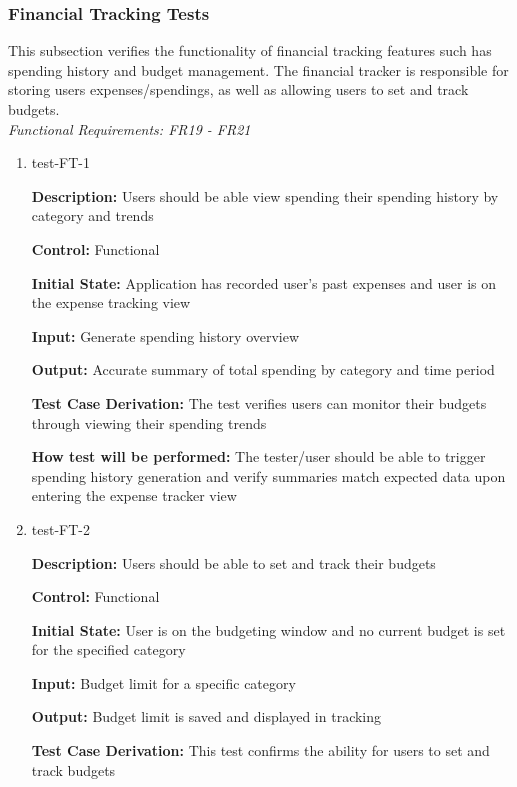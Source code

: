 \documentclass[12pt, titlepage]{article}
\begin{document}
\subsubsection{Financial Tracking Tests}

This subsection verifies the functionality of financial tracking features such has spending history and budget management. The financial tracker is responsible for storing users expenses/spendings, as well as allowing users to set and track budgets.\\
\textit{Functional Requirements: FR19 - FR21}

\begin{enumerate}

\item{test-FT-1\\}

\textbf{Description:} Users should be able view spending their spending history by category and trends

\textbf{Control:} Functional

\textbf{Initial State:} Application has recorded user's past expenses and user is on the expense tracking view

\textbf{Input:} Generate spending history overview

\textbf{Output:} Accurate summary of total spending by category and time period

\textbf{Test Case Derivation:} The test verifies users can monitor their budgets through viewing their spending trends

\textbf{How test will be performed:} The tester/user should be able to trigger spending history generation and verify summaries match expected data upon entering the expense tracker view

\item{test-FT-2\\}

\textbf{Description:} Users should be able to set and track their budgets

\textbf{Control:} Functional

\textbf{Initial State:} User is on the budgeting window and no current budget is set for the specified category

\textbf{Input:} Budget limit for a specific category

\textbf{Output:} Budget limit is saved and displayed in tracking

\textbf{Test Case Derivation:} This test confirms the ability for users to set and track budgets


\end{enumerate}
\end{document}

